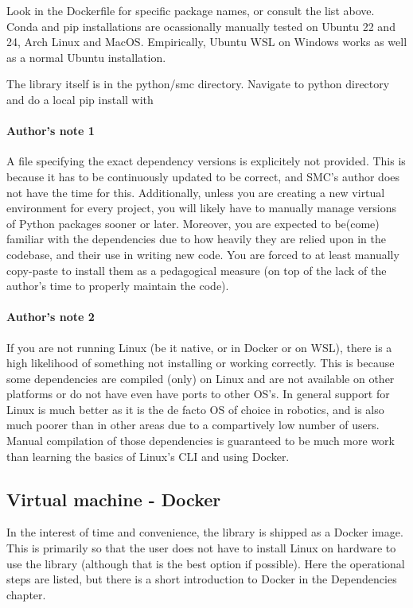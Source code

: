 Look in the Dockerfile for specific package names, 
or consult the list above. Conda and pip installations 
are ocassionally manually tested
on Ubuntu 22 and 24, Arch Linux and MacOS. 
Empirically, Ubuntu WSL on Windows works as well as a 
normal Ubuntu installation.

The library itself is in the python/smc directory. 
Navigate to python directory and do a local pip install with 

\paragraph{Author's note 1} 
A file specifying the exact dependency versions is explicitely not provided.
This is because it has to be continuously updated to be correct, 
and SMC's author does not have the time for this. 
Additionally, unless you are creating 
a new virtual environment for every project,
you will likely have to manually manage 
versions of Python packages sooner or later.
Moreover, you are expected to be(come) 
familiar with the dependencies due to how heavily
they are relied upon in the codebase, and their use in writing new code.
You are forced to at least manually copy-paste 
to install them as a pedagogical measure
(on top of the lack of the author's time to properly maintain the code). 

\paragraph{Author's note 2}
If you are not running Linux (be it native, or in Docker or on WSL), 
there is a high likelihood of
something not installing or working correctly. 
This is because some dependencies 
are compiled (only) on Linux and are not available on other platforms 
or do not have even have ports to other OS's.
In general support for Linux is much better as it is 
the de facto OS of choice in robotics,
and is also much poorer than in other areas due 
to a compartively low number of users.
Manual compilation of those dependencies is guaranteed to be much more work
than learning the basics of Linux's CLI and using Docker.

\subsection{Virtual machine - Docker}
In the interest of time and convenience, the library is shipped as a Docker image.
This is primarily so that the user does not have to install
Linux on hardware to use the library (although that is the
best option if possible).
Here the operational steps are listed, but there
is a short introduction to Docker in the Dependencies chapter.

